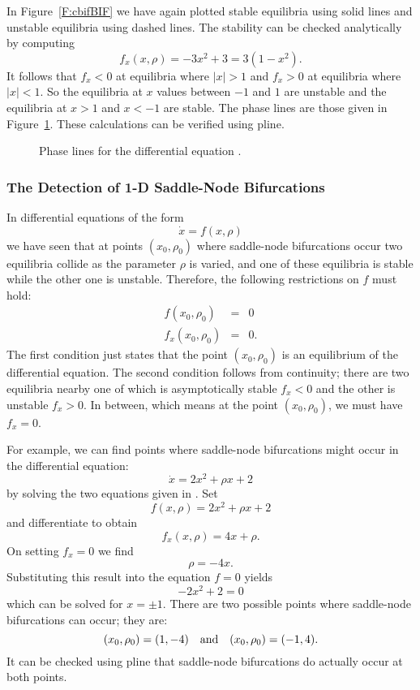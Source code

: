 In Figure~\ref{F:cbifBIF} we have again plotted stable equilibria
 using solid lines and unstable equilibria
 using dashed lines.  The
stability can be checked analytically by computing
\[
f_x(x,\rho) = -3x^2+3 = 3(1-x^2).
\]
It follows that $f_x<0$ at equilibria where $|x|>1$ and $f_x>0$ at 
equilibria where $|x|<1$.  So the equilibria at $x$ values between 
$-1$ and $1$ are unstable and the equilibria at $x>1$ and $x<-1$ are 
stable.  The phase lines are those given in Figure~\ref{F:cbif}.  These 
calculations can be verified using {\sf pline}. 

\vspace{0.4in}

\begin{figure}[htb]
           \centerline{%
           }
           \caption{Phase lines for the differential equation
        \protect{}.}
           \label{F:cbif}
\end{figure}

\subsubsection*{The Detection of 1-D Saddle-Node Bifurcations}

In differential equations of the form
\[
\dot{x} = f(x,\rho)
\]
we have seen that at points $(x_0,\rho_0)$ where saddle-node bifurcations
occur two equilibria collide as the parameter $\rho$ is varied, and one of 
these equilibria is stable while the other one is unstable.  Therefore, the
following restrictions on $f$ must hold:
\begin{equation}  \label{E:DCSN}
\begin{array}{rcl}
f(x_0,\rho_0) & = & 0\\
f_x(x_0,\rho_0) & = & 0.
\end{array}
\end{equation}
The first condition just states that the point $(x_0,\rho_0)$ is an
equilibrium of the differential equation.  The second condition follows from
continuity; there are two equilibria nearby one of which is asymptotically 
stable $f_x<0$ and the other is unstable $f_x>0$.  In between, which means at
the point $(x_0,\rho_0)$, we must have $f_x=0$.

For example, we can find points where saddle-node bifurcations might occur in 
the differential equation:
\[
\dot{x} = 2x^2 +\rho x + 2
\]
by solving the two equations given in .  Set 
\[
f(x,\rho) = 2x^2 +\rho x + 2
\]
and differentiate to obtain
\[
f_x(x,\rho) = 4x + \rho.
\]
On setting $f_x=0$ we find
\[
\rho = -4x.
\]
Substituting this result into the equation $f=0$ yields
\[
-2x^2 + 2 =0
\]
which can be solved for $x=\pm 1$.  There are two possible points where
saddle-node bifurcations can occur; they are:
\[
(x_0,\rho_0) = (1,-4) \quad\mbox{and}\quad  (x_0,\rho_0) = (-1,4).
\]
It can be checked using {\sf pline} that saddle-node bifurcations do actually
occur at both points.

